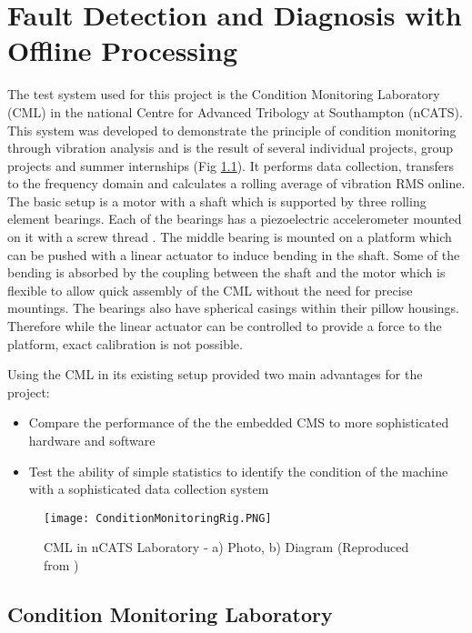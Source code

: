 \chapter{Fault Detection and Diagnosis with Offline Processing}


The test system used for this project is the Condition Monitoring Laboratory (CML) in the national Centre for Advanced Tribology at Southampton (nCATS).
This system was developed to demonstrate the principle of condition monitoring through vibration analysis and is the result of several individual projects, group projects and summer internships (Fig \ref{fig:CMrig}).
It performs data collection, transfers to the frequency domain and calculates a rolling average of vibration RMS online.
The basic setup is a motor with a shaft which is supported by three rolling element bearings.
Each of the bearings has a piezoelectric accelerometer mounted on it with a screw thread \cite{CMlab}.
The middle bearing is mounted on a platform which can be pushed with a linear actuator to induce bending in the shaft.
Some of the bending is absorbed by the coupling between the shaft and the motor which is flexible to allow quick assembly of the CML without the need for precise mountings.
The bearings also have spherical casings within their pillow housings.
Therefore while the linear actuator can be controlled to provide a force to the platform, exact calibration is not possible.
\par

Using the CML in its existing setup provided two main advantages for the project:
\begin{itemize}
    \item Compare the performance of the the embedded CMS to more sophisticated hardware and software
    \item Test the ability of simple statistics to identify the condition of the machine with a sophisticated data collection system
\end{itemize}

\begin{figure}
    \centering
    \texttt{[image: ConditionMonitoringRig.PNG]}
    \caption{CML in nCATS Laboratory - a) Photo, b) Diagram (Reproduced from \cite{CMlab})}
    \label{fig:CMrig}
\end{figure}

\section{Condition Monitoring Laboratory}

